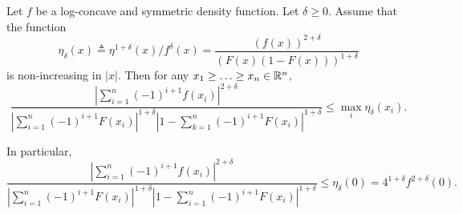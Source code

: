 \begin{lem}
  \label{lem:bound_intervals_delta}
  Let $f$ be a log-concave and symmetric density
  function. Let $\delta\geq 0$. Assume that the function
  \begin{equation*}
    \eta_\delta(x) \triangleq  \eta^{1+\delta}(x)/f^\delta(x)
    = \frac{  \left( f(x) \right)^{2+\delta}}{\left(F(x)(1-F(x))\right)^{1+\delta}}
  \end{equation*}
  is non-increasing in $|x|$. Then for any $x_1 \ge \ldots \ge x_n \in \mathbb{R}^n$,
  \begin{equation}
    \frac{ \left| \sum_{i=1}^n (-1)^{i+1} f(x_i) \right|^{2+\delta} } {\left|
      \sum_{i=1}^n (-1)^{i+1} F(x_i) \right|^{1+\delta} \left|1- \sum_{k=1}^n
      (-1)^{i+1} F(x_i) \right|^{1+\delta} } \leq \max_{i} \eta_\delta(x_i).
    \label{eq:lem_bound_intervals_delta}
  \end{equation}
\end{lem}
In particular, 
\begin{equation*}
\frac{ \left| \sum_{i=1}^n (-1)^{i+1} f(x_i) \right|^{2+\delta} }
{\left| \sum_{i=1}^n (-1)^{i+1} F(x_i) \right|^{1+\delta} \left|1- \sum_{i=1}^n (-1)^{i+1} F(x_i) \right|^{1+\delta} } 
\leq \eta_\delta(0) = 4^{1+\delta} f^{2+\delta}(0).
\end{equation*}

